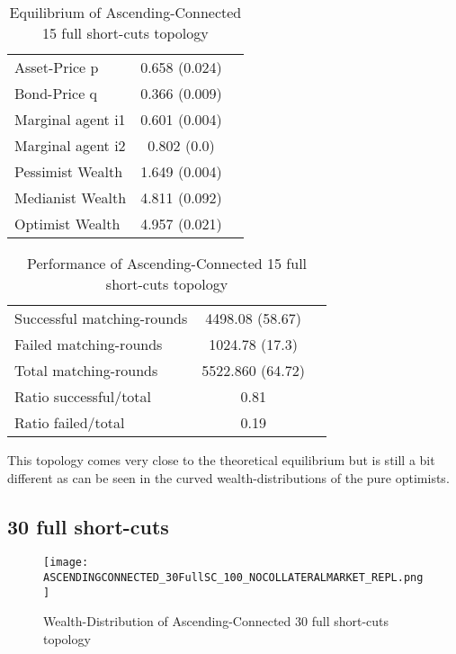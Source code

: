 \documentclass[Bachelorarbeit.tex]{subfiles}
\begin{document}
\begin{table}[H]
	\caption{Equilibrium of Ascending-Connected 15 full short-cuts topology}
	\centering
	\begin{tabular} { l c r }
		\hline
		Asset-Price p & 0.658 (0.024) \\
		Bond-Price q & 0.366 (0.009) \\
		Marginal agent i1 & 0.601 (0.004) \\
		Marginal agent i2 & 0.802 (0.0) \\
		\hline
		Pessimist Wealth & 1.649 (0.004) \\
		Medianist Wealth & 4.811 (0.092) \\
		Optimist Wealth & 4.957 (0.021) \\
		\hline
	\end{tabular}
\end{table} 

\begin{table}[H]
	\caption{Performance of Ascending-Connected 15 full short-cuts topology}
	\centering
	\begin{tabular} { l c r }
		\hline
		Successful matching-rounds& 4498.08 (58.67) \\
		Failed matching-rounds & 1024.78 (17.3) \\
		Total matching-rounds & 5522.860 (64.72) \\
		\hline
		Ratio successful/total & 0.81 \\
		Ratio failed/total & 0.19 \\
		\hline
	\end{tabular}
\end{table}

This topology comes very close to the theoretical equilibrium but is still a bit different as can be seen in the curved wealth-distributions of the pure optimists.

\subsection{30 full short-cuts}
\begin{figure}[H]
	\centering
  \texttt{[image: ASCENDINGCONNECTED\_30FullSC\_100\_NOCOLLATERALMARKET\_REPL.png]}
	\caption{Wealth-Distribution of Ascending-Connected 30 full short-cuts topology}
	\label{fig:wealth_ASCENDINGCONNECTED_30FullSC_100_NOCOLLATERALMARKET_REPL}
\end{figure}
\end{document}
